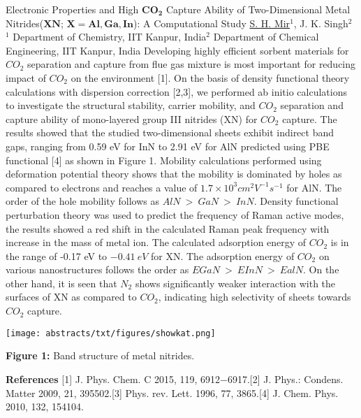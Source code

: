 
    \begin{abstract_online}{Electronic Properties and High $\mathbf{CO_2}$ Capture Ability of Two-Dimensional Metal Nitrides($\mathbf{XN}$; $\mathbf{X = Al, Ga, In}$): A Computational Study}{%
        \underline{S. H. Mir}$^{1}$, J. K. Singh$^{2}$}{%
        }{%
        $^1$ Department of Chemistry, IIT Kanpur, India\newline{}$^2$ Department of Chemical Engineering, IIT Kanpur, India}
    Developing highly efficient sorbent materials for $CO_2$ separation and capture from flue gas mixture is most important for reducing impact of $CO_2$ on the environment [1]. On the basis of density functional theory calculations with dispersion correction [2,3], we performed ab initio calculations to investigate the structural stability, carrier mobility, and $CO_2$ separation and capture ability of mono-layered group III nitrides (XN) for $CO_2$ capture. The results showed that the studied two-dimensional sheets exhibit indirect band gaps, ranging from 0.59 eV for InN to 2.91 eV for AlN predicted using PBE functional [4] as shown in Figure 1. Mobility calculations performed using deformation potential theory shows that the mobility is dominated by holes as compared to electrons and reaches a value of $1.7 \times 10^3 cm^2 V^{−1} s^{−1}$ for AlN. The order of the hole mobility follows as $AlN \ > \ GaN \ > \ InN$. Density functional perturbation theory was used to predict the frequency of Raman active modes, the results showed a red shift in the calculated Raman peak frequency with increase in the mass of metal ion. The calculated adsorption energy of $CO_2$ is in the range of -0.17 eV to $-0.41 \ eV$ for XN. The adsorption energy of $CO_2$ on various nanostructures follows the order as $EGaN \ > \  EInN \ > \ EalN$. On the other hand, it is seen that $N_2$ shows significantly weaker interaction with the surfaces of XN as compared to $CO_2$, indicating high selectivity of sheets towards $CO_2$ capture. \begin{center}  \texttt{[image: abstracts/txt/figures/showkat.png]}  \caption{\textbf{Figure 1:} Band structure of metal nitrides.}  \end{center} 
    
        \textbf{References} \newline{}[1] J. Phys. Chem. C 2015, 119, 6912−6917.\newline{}[2] J. Phys.: Condens. Matter 2009, 21, 395502.\newline{}[3] Phys. rev. Lett. 1996, 77, 3865.\newline{}[4] J. Chem. Phys. 2010, 132, 154104.
    \end{abstract_online}
    